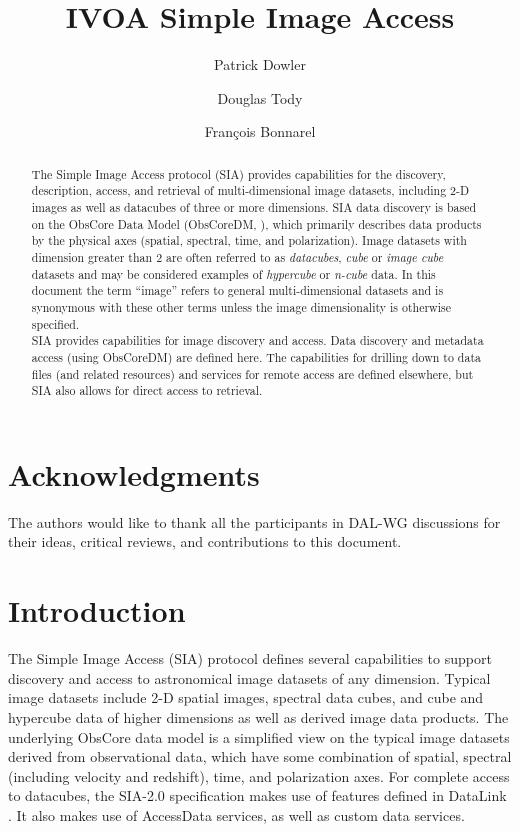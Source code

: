 \documentclass[11pt,a4paper]{ivoa}
\title{IVOA Simple Image Access}
\author{Patrick Dowler}
\author{Douglas Tody}
\author{Fran\c cois Bonnarel}
\begin{document}
\begin{abstract}
The Simple Image Access protocol (SIA) provides capabilities for the discovery, description, access, and retrieval of multi-dimensional image datasets, including 2-D images as well as datacubes of three or more dimensions.  SIA data discovery is based on the ObsCore Data Model (ObsCoreDM, \cite{std:OBSCORE}), which primarily describes data products by the physical axes (spatial, spectral, time, and polarization). Image datasets with dimension greater than 2 are often referred to as \textit{datacubes}, \textit{cube} or \textit{image cube} datasets and may be considered examples of \textit{hypercube} or \textit{n-cube} data.  In this document the term “image” refers to general multi-dimensional datasets and is synonymous with these other terms unless the image dimensionality is otherwise specified. \\
SIA provides capabilities for image discovery and access. Data discovery and  metadata access (using ObsCoreDM) are defined here. The capabilities for drilling down  to data files (and related resources) and services for remote access are defined elsewhere, but SIA also allows for direct access to retrieval. 
\end{abstract}
\section*{Acknowledgments}
The authors would like to thank all the participants in DAL-WG discussions  for their ideas, critical reviews, and contributions to this document.

\section{Introduction}
The Simple Image Access (SIA) protocol defines several capabilities to support discovery and access to astronomical image datasets of any dimension.  Typical image datasets include 2-D spatial images, spectral data cubes, and cube and hypercube data of higher dimensions as well as derived image data products.  The underlying ObsCore data model is a simplified view on the typical image datasets derived from observational data, which have some combination of spatial, spectral (including velocity and redshift), time, and polarization axes.  
For complete access to datacubes, the SIA-2.0 specification  makes use of features defined in DataLink \citep{std:DataLink}. It also makes use of AccessData services, as well as custom data services.
\end{document}
